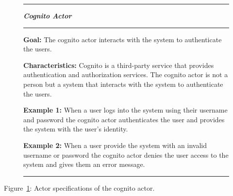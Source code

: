 \begin{figure}[H]
    \noindent
    \rule{\textwidth}{0.4pt}
    \begin{center}
        \noindent
        \textit{\textbf{Cognito Actor}}
    \end{center}

    \noindent
    \rule{\textwidth}{0.4pt}

    \noindent
    \textbf{Goal:} The cognito actor interacts with the system to authenticate the users.
    \newline

    \noindent
    \textbf{Characteristics:} Cognito is a third-party service that provides authentication and authorization services.
    The cognito actor is not a person but a system that interacts with the system to authenticate the users.
    \newline

    \noindent
    \textbf{Example 1:} When a user logs into the system using their username and password the cognito actor
    authenticates the user and provides the system with the user's identity.

    \noindent
    \textbf{Example 2:} When a user provide the system with an invalid username or password the cognito actor
    denies the user access to the system and gives them an error message.

    \noindent
    \rule{\textwidth}{0.4pt}\label{fig:actor-cognito}
\end{figure}

Figure~\ref{fig:actor-cognito}: Actor specifications of the cognito actor.
